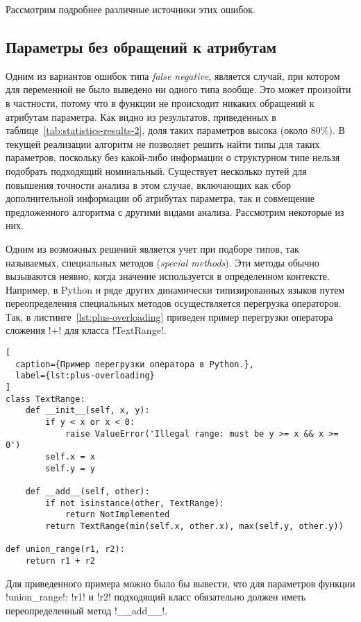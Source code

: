 Рассмотрим подробнее различные источники этих ошибок.

\subsection{Параметры без обращений к атрибутам}
\label{sub:attributeless-parameters}

Одним из вариантов ошибок типа \emph{false negative}, является случай, при
котором для переменной не было выведено ни одного типа вообще. Это может
произойти в частности, потому что в функции не происходит никаких обращений к
атрибутам параметра. Как видно из результатов, приведенных в
таблице~\ref{tab:statistics-results-2}, доля таких параметров высока (около
80\%). В текущей реализации алгоритм не позволяет решить найти типы для таких
параметров, поскольку без какой-либо информации о структурном типе нельзя
подобрать подходящий номинальный. Существует несколько путей для повышения
точности анализа в этом случае, включающих как сбор дополнительной информации об
атрибутах параметра, так и совмещение предложенного алгоритма с другими видами
анализа. Рассмотрим некоторые из них.

Одним из возможных решений является учет при подборе типов, так называемых,
специальных методов (\emph{special methods}). Эти методы обычно вызываются
неявно, когда значение используется в определенном контексте. Например, в
Python и ряде других динамически типизированных языков путем переопределения
специальных методов осуществляется перегрузка операторов.  Так, в
листинге~\ref{lst:plus-overloading} приведен пример перегрузки оператора
сложения !+! для класса !TextRange!.

\begin{lstlisting}[
  caption={Пример перегрузки оператора в Python.},
  label={lst:plus-overloading}
]
сlass TextRange:
    def __init__(self, x, y):
        if y < x or x < 0:
            raise ValueError('Illegal range: must be y >= x && x >= 0')
        self.x = x
        self.y = y

    def __add__(self, other):
        if not isinstance(other, TextRange):
            return NotImplemented
        return TextRange(min(self.x, other.x), max(self.y, other.y))

def union_range(r1, r2):
    return r1 + r2    

\end{lstlisting}

Для приведенного примера можно было бы вывести, что для параметров функции
!union_range!: !r1! и !r2! подходящий класс обязательно должен иметь
переопределенный метод !__add__!. 

